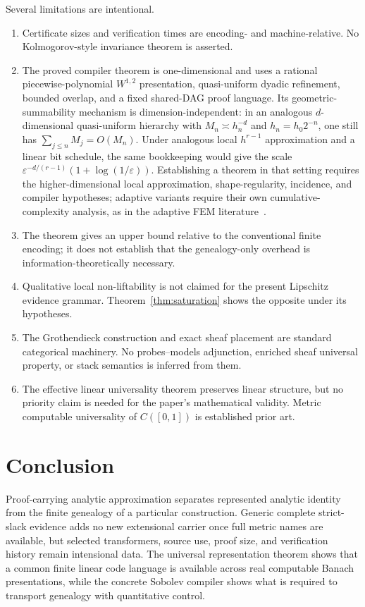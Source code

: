 \documentclass[11pt]{article}
\theoremstyle{definition}
\begin{document}
Several limitations are intentional.
\begin{enumerate}[label=(\arabic*)]
\item Certificate sizes and verification times are encoding- and machine-relative.  No
Kolmogorov-style invariance theorem is asserted.
\item The proved compiler theorem is one-dimensional and uses a rational
piecewise-polynomial $W^{1,2}$ presentation, quasi-uniform dyadic refinement, bounded
overlap, and a fixed shared-DAG proof language.  Its geometric-summability mechanism is
dimension-independent: in an analogous $d$-dimensional quasi-uniform hierarchy with
$M_n\asymp h_n^{-d}$ and $h_n=h_0 2^{-n}$, one still has
$\sum_{j\le n}M_j=O(M_n)$.  Under analogous local $h^{r-1}$ approximation and a linear
bit schedule, the same bookkeeping would give the scale
$\varepsilon^{-d/(r-1)}(1+\log(1/\varepsilon))$.  Establishing a theorem in that setting
requires the higher-dimensional local approximation, shape-regularity, incidence, and
compiler hypotheses; adaptive variants require their own cumulative-complexity analysis,
as in the adaptive FEM literature~\cite{BinevDahmenDeVore,Stevenson}.
\item The theorem gives an upper bound relative to the conventional finite encoding; it
does not establish that the genealogy-only overhead is information-theoretically
necessary.
\item Qualitative local non-liftability is not claimed for the present Lipschitz evidence
grammar.  Theorem~\ref{thm:saturation} shows the opposite under its hypotheses.
\item The Grothendieck construction and exact sheaf placement are standard categorical
machinery.  No probes--models adjunction, enriched sheaf universal property, or stack
semantics is inferred from them.
\item The effective linear universality theorem preserves linear structure, but no
priority claim is needed for the paper's mathematical validity.  Metric computable
universality of $C([0,1])$ is established prior art.
\end{enumerate}

\section{Conclusion}\label{sec:conclusion}

Proof-carrying analytic approximation separates represented analytic identity from the
finite genealogy of a particular construction.  Generic complete strict-slack evidence
adds no new extensional carrier once full metric names are available, but selected
transformers, source use, proof size, and verification history remain intensional data.
The universal representation theorem shows that a common finite linear code language is
available across real computable Banach presentations, while the concrete Sobolev compiler
shows what is required to transport genealogy with quantitative control.
\end{document}
